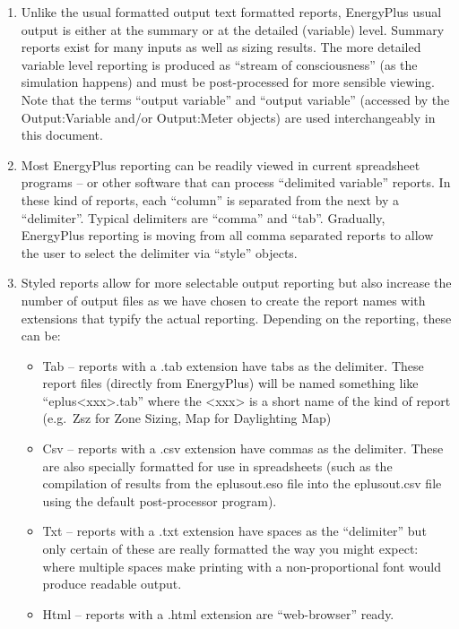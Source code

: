 \begin{enumerate}
  \item
    Unlike the usual formatted output text formatted reports, EnergyPlus usual output is either at the summary or at the detailed (variable) level. Summary reports exist for many inputs as well as sizing results. The more detailed variable level reporting is produced as ``stream of consciousness'' (as the simulation happens) and must be post-processed for more sensible viewing. Note that the terms ``output variable'' and ``output variable'' (accessed by the Output:Variable and/or Output:Meter objects) are used interchangeably in this document.
  \item
    Most EnergyPlus reporting can be readily viewed in current spreadsheet programs -- or other software that can process ``delimited variable'' reports. In these kind of reports, each ``column'' is separated from the next by a ``delimiter''. Typical delimiters are ``comma'' and ``tab''. Gradually, EnergyPlus reporting is moving from all comma separated reports to allow the user to select the delimiter via ``style'' objects.
  \item
    Styled reports allow for more selectable output reporting but also increase the number of output files as we have chosen to create the report names with extensions that typify the actual reporting. Depending on the reporting, these can be:
    \begin{itemize}
      \item
        Tab -- reports with a .tab extension have tabs as the delimiter. These report files (directly from EnergyPlus) will be named something like ``eplus\textless{}xxx\textgreater{}.tab'' where the \textless{}xxx\textgreater{} is a short name of the kind of report (e.g.~Zsz for Zone Sizing, Map for Daylighting Map)
      \item
        Csv -- reports with a .csv extension have commas as the delimiter. These are also specially formatted for use in spreadsheets (such as the compilation of results from the eplusout.eso file into the eplusout.csv file using the default post-processor program).
      \item
        Txt -- reports with a .txt extension have spaces as the ``delimiter'' but only certain of these are really formatted the way you might expect: where multiple spaces make printing with a non-proportional font would produce readable output.
      \item
        Html -- reports with a .html extension are ``web-browser'' ready.
    \end{itemize}
\end{enumerate}